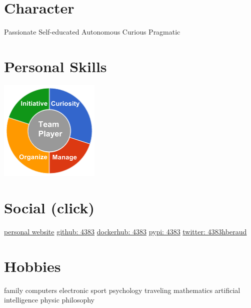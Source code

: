 \documentclass[]{friggeri-cv}
\begin{document}
\begin{aside}
~
~
~
    \section{Character}
        Passionate
        Self-educated
        Autonomous
        Curious
        Pragmatic
        ~
    \section{Personal Skills}
        \includegraphics[scale=0.62]{img/personal.png}
        ~
    \section{Social (click)}
        \href{http://herve.beraud.ovh/}{personal website}
        \href{https://github.com/4383}{github: 4383}
        \href{https://hub.docker.com/r/4383}{dockerhub: 4383}
        \href{https://warehouse.python.org/user/4383/}{pypi: 4383}
        \href{https://twitter.com/4383hberaud}{twitter: 4383hberaud}
        ~
    \section{Hobbies}
        family
        computers
        electronic
        sport
        psychology
        traveling
        mathematics
        artificial intelligence
        physic
        philosophy
\end{aside}

\newpage
\end{document}
